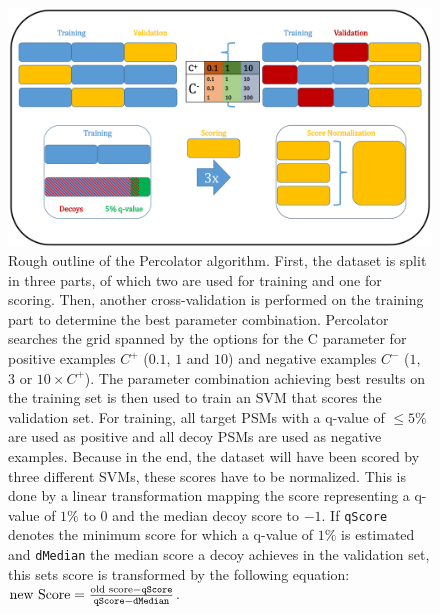 \begin{figure}
	\normalsize
	\centering
	\includegraphics[width = \textwidth]{figures/Percolator_diagram.pdf}
	\caption[The Percolator algorithm]{Rough outline of the Percolator algorithm. First, the dataset is split in three parts, of which two are used for training and one for scoring. Then, another cross-validation is performed on the training part to determine the best parameter combination. Percolator searches the grid spanned by the options for the C parameter for positive examples $C^{+}$ ($0.1$, $1$ and $10$) and negative examples $C^{-}$ ($1$, $3$ or $10 \times C^{+}$). The parameter combination achieving best results on the training set is then used to train an SVM that scores the validation set. For training, all target PSMs with a q-value of $\leq 5\%$ are used as positive and all decoy PSMs are used as negative examples. Because in the end, the dataset will have been scored by three different SVMs, these scores have to be normalized. This is done by a linear transformation mapping the score representing a q-value of $1\%$ to $0$ and the median decoy score to $-1$. If \texttt{qScore} denotes the minimum score for which a q-value of $1\%$ is estimated and \texttt{dMedian} the median score a decoy achieves in the validation set, this sets score is transformed by the following equation: $\text{new Score} = \frac{\text{old score} - \text{\texttt{qScore}}}{\text{\texttt{qScore}} - \text{\texttt{dMedian}}}$.}
	\label{fig:percolator}
\end{figure}
\renewcommand{\baselinestretch}{1}\\

